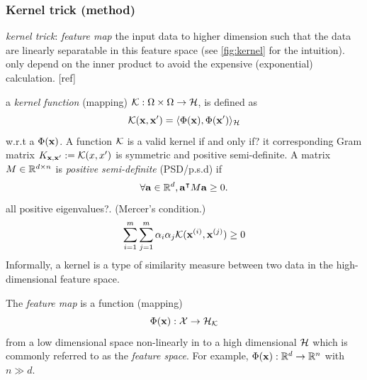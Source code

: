 \subsubsection{Kernel trick (method)}
\emph{kernel trick}: \emph{feature map} the input data to higher dimension such that the data are linearly separatable in this feature space (see \cref{fig:kernel} for the intuition).
only depend on the inner product to avoid the expensive (exponential) calculation. [ref]
\begin{definition}\label{def:kernel}
	a \emph{kernel function} (mapping) $\mathcal{K}: \Omega\times\Omega\to\mathcal{H}$,
	is defined as 
	\begin{equation}
		\mathcal{K}(\vb{x},\vb{x}') = \langle \Phi(\vb{x}),\Phi(\vb{x}') \rangle_{\mathcal{H}}
		\label{eq:kernel_classical}
	\end{equation}
	w.r.t a  $\Phi(\vb{x})$.
	A function $\mathcal{K}$ is a valid kernel if and only if? it corresponding Gram matrix $K_{\vb{x},\vb{x}'}:=\mathcal{K}(x,x')$ is symmetric and positive semi-definite.
	A matrix $M\in\mathbb{R}^{d\times n}$ is \emph{positive semi-definite} (PSD/p.s.d) if
	\begin{equation}
		\forall \vb{a} \in \mathbb{R}^d, \vb{a}^\intercal M \vb{a} \ge 0.
	\end{equation}
	all positive eigenvalues?. (Mercer's condition.)
	\begin{equation}
		\sum_{i=1}^m \sum_{j=1}^m \alpha_i\alpha_j \mathcal{K}(\vb{x}^{(i)},\vb{x}^{(j)}) \ge 0
	\end{equation}
	Informally, a kernel is a type of similarity measure between two data in the high-dimensional feature space.
\end{definition}
\begin{definition}\label{def:feature_map_classical}
	The \emph{feature map} is a function (mapping)
	\begin{equation}
		\Phi(\vb{x}) : \mathcal{X} \to \mathcal{H}_{\mathcal{K}}
		\label{eq:feature_map_classical}
	\end{equation}
	from a low dimensional space non-linearly in to a high dimensional  $\mathcal{H}$ which is commonly referred to as the \emph{feature space}.
	For example, $\Phi(\vb{x}):\mathbb{R}^d \to \mathbb{R}^n$ with $n\gg d$.
\end{definition}
